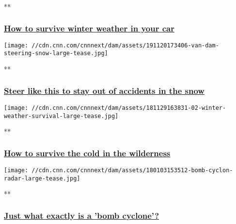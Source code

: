 **

\hypertarget{how-to-survive-winter-weather-in-your-car}{%
\subsubsection{\texorpdfstring{\href{/videos/weather/2018/11/19/winter-car-survival-explainer-wx-ncc-orig.cnn}{How
to survive winter weather in your
car}}{How to survive winter weather in your car}}\label{how-to-survive-winter-weather-in-your-car}}

\href{/videos/weather/2019/11/20/driving-in-snow-steering-orig.cnn}{}

\texttt{[image: //cdn.cnn.com/cnnnext/dam/assets/191120173406-van-dam-steering-snow-large-tease.jpg]}

**

\hypertarget{steer-like-this-to-stay-out-of-accidents-in-the-snow}{%
\subsubsection{\texorpdfstring{\href{/videos/weather/2019/11/20/driving-in-snow-steering-orig.cnn}{Steer
like this to stay out of accidents in the
snow}}{Steer like this to stay out of accidents in the snow}}\label{steer-like-this-to-stay-out-of-accidents-in-the-snow}}

\href{/videos/weather/2018/11/29/winter-wilderness-survival-explainer-wx-ncc-llr-orig.cnn}{}

\texttt{[image: //cdn.cnn.com/cnnnext/dam/assets/181129163831-02-winter-weather-survival-large-tease.jpg]}

**

\hypertarget{how-to-survive-the-cold-in-the-wilderness-}{%
\subsubsection{\texorpdfstring{\href{/videos/weather/2018/11/29/winter-wilderness-survival-explainer-wx-ncc-llr-orig.cnn}{How
to survive the cold in the wilderness
}}{How to survive the cold in the wilderness }}\label{how-to-survive-the-cold-in-the-wilderness-}}

\href{/videos/us/2018/01/03/bomb-cyclone-explainer-gray-orig-js.cnn}{}

\texttt{[image: //cdn.cnn.com/cnnnext/dam/assets/180103153512-bomb-cyclon-radar-large-tease.jpg]}

**

\hypertarget{just-what-exactly-is-a-bomb-cyclone}{%
\subsubsection{\texorpdfstring{\href{/videos/us/2018/01/03/bomb-cyclone-explainer-gray-orig-js.cnn}{Just
what exactly is a 'bomb
cyclone'?}}{Just what exactly is a 'bomb cyclone'?}}\label{just-what-exactly-is-a-bomb-cyclone}}

